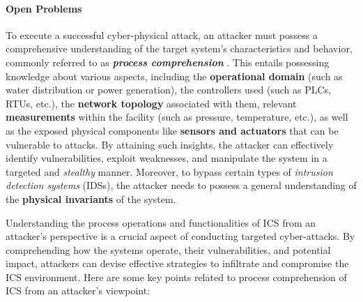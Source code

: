 \paragraph{Open Problems}
\label{par:1_open_problems}
To execute a successful cyber-physical attack, an attacker must possess a comprehensive understanding of the target system's characteristics and behavior, commonly referred to as \textbf{\textit{process comprehension}} \cite{green_et_al}. This entails possessing knowledge about various aspects, including the \textbf{operational domain} (such as water distribution or power generation), the controllers used (such as PLCs, RTUs, etc.), the \textbf{network topology} associated with them, relevant \textbf{measurements} within the facility (such as pressure, temperature, etc.), as well as the exposed physical components like \textbf{sensors and actuators} that can be vulnerable to attacks. By attaining such insights, the attacker can effectively identify vulnerabilities, exploit weaknesses, and manipulate the system in a targeted and \textit{stealthy} manner. Moreover, to bypass certain types of \textit{intrusion detection systems} (IDSs), the attacker needs to possess a general understanding of the \textbf{physical invariants} of the system.

\bigskip
Understanding the process operations and functionalities of ICS from an attacker's perspective is a crucial aspect of conducting targeted cyber-attacks. By comprehending how the systems operate, their vulnerabilities, and potential impact, attackers can devise effective strategies to infiltrate and compromise the ICS environment. Here are some key points related to process comprehension of ICS from an attacker's viewpoint:

